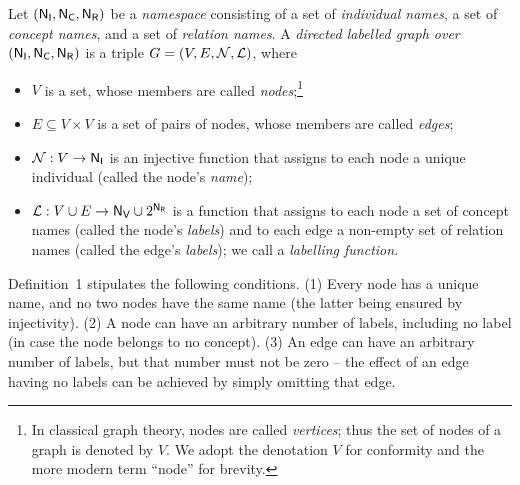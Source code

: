 \begin{definition}
  \label{def:ld_graph}
  Let $(\mathsf{N}_\mathsf{I},\mathsf{N}_\mathsf{C},\mathsf{N}_\mathsf{R})$ be a \emph{namespace} consisting of a set \NI of \emph{individual names}, a set \NC of \emph{concept names}, and a set \NR of \emph{relation names}.
  A \emph{directed labelled graph over $(\mathsf{N}_\mathsf{I},\mathsf{N}_\mathsf{C},\mathsf{N}_\mathsf{R})$} is a triple $G = (V,E,\mathcal{N},\mathcal{L})$,
  where
  \begin{itemize}
    \item
      $V$ is a set, whose members are called \emph{nodes};\footnote{%
        In classical graph theory, nodes are called \emph{vertices}; thus the set of
        nodes of a graph is denoted by $V$. We adopt the denotation $V$ for conformity
        and the more modern term ``node'' for brevity.%
      }      
    \item 
      $E \subseteq V \times V$ is a set of pairs of nodes, whose members are called \emph{edges};
    \item
      $\mathcal{N} : V \to \mathsf{N}_\mathsf{I}$ is an injective function that assigns
      to each node a unique individual (called the node's \emph{name});
    \item
      $\mathcal{L} : V \cup E \to \mathsf{N}_\mathsf{V} \cup 2^{\mathsf{N}_\mathsf{R}}$ is a function that assigns 
      to each node a set of concept names (called the node's \emph{labels}) and
      to each edge a non-empty set of relation names (called the edge's \emph{labels});
      we call \Lmc a \emph{labelling function}.
  \end{itemize}
\end{definition}
%
Definition~1 stipulates the following conditions.
%
(1) Every node has a unique name, and no two nodes have the same name (the latter being ensured by injectivity).
(2) A node can have an arbitrary number of labels, including no label (in case the node belongs to no concept).
(3) An edge can have an arbitrary number of labels, but that number must not be zero --
the effect of an edge having no labels can be achieved by simply omitting that edge.

